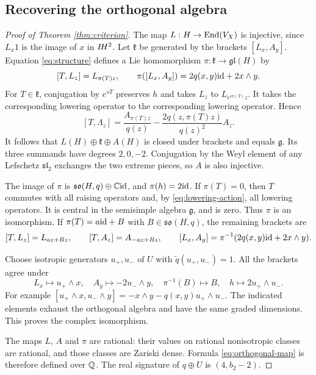 \subsection{Recovering the orthogonal algebra}
\begin{proof}[Proof of Theorem \ref{thm:criterion}]
The map $L:H\to\operatorname{End}(V_X)$ is injective, since $L_x1$ is the image
of $x$ in $I\!H^2$. Let $\mathfrak k$ be generated by the brackets
$[L_x,A_y]$. Equation \eqref{eq:structure} defines a Lie
homomorphism $\pi:\mathfrak k\to\mathfrak{gl}(H)$ by
\[
 [T,L_z]=L_{\pi(T)z},\qquad
 \pi([L_x,A_y])=2q(x,y)\mathrm{id}+2x\wedge y.
\]
For $T\in\mathfrak k$, conjugation by $e^{sT}$ preserves $h$ and
takes $L_z$ to $L_{e^{s\pi(T)}z}$. It takes the corresponding
lowering operator to the corresponding lowering operator. Hence
\begin{equation}\label{eq:lowering-action}
 [T,\Lambda_z]=\frac{A_{\pi(T)z}}{q(z)}
 -\frac{2q(z,\pi(T)z)}{q(z)^2}A_z.
\end{equation}
It follows that $L(H)\oplus\mathfrak k\oplus A(H)$ is closed
under brackets and equals $\mathfrak g$. Its three summands have
degrees $2,0,-2$. Conjugation by the Weyl element of any Lefschetz
$\mathfrak{sl}_2$ exchanges the two extreme pieces, so $A$ is also
injective.

The image of $\pi$ is
$\mathfrak{so}(H,q)\oplus\mathbb C\mathrm{id}$, and $\pi(h)=2\mathrm{id}$.
If $\pi(T)=0$, then $T$ commutes with all raising operators and,
by \eqref{eq:lowering-action}, all lowering operators. It is
central in the semisimple algebra $\mathfrak g$, and is zero.
Thus $\pi$ is an isomorphism. If $\pi(T)=a\mathrm{id}+B$ with
$B\in\mathfrak{so}(H,q)$, the remaining brackets are
\[
 [T,L_z]=L_{az+Bz},\qquad [T,A_z]=A_{-az+Bz},\qquad
 [L_x,A_y]=\pi^{-1}(2q(x,y)\mathrm{id}+2x\wedge y).
\]

Choose isotropic generators $u_+,u_-$ of $U$ with
$\widetilde q(u_+,u_-)=1$. All the brackets agree under
\begin{equation}\label{eq:orthogonal-map}
 L_x\longmapsto u_+\wedge x,\quad
 A_y\longmapsto-2u_-\wedge y,\quad
 \pi^{-1}(B)\longmapsto B,\quad
 h\longmapsto2u_+\wedge u_-.
\end{equation}
For example
$[u_+\wedge x,u_-\wedge y]=-x\wedge y-q(x,y)u_+\wedge u_-$.
The indicated elements exhaust the orthogonal algebra and have the
same graded dimensions. This proves the complex isomorphism.

The maps $L$, $A$ and $\pi$ are rational: their values on rational
nonisotropic classes are rational, and those classes are Zariski
dense. Formula \eqref{eq:orthogonal-map} is therefore defined over
$\mathbb Q$. The real signature of $q\oplus U$ is $(4,b_2-2)$.
\end{proof}

